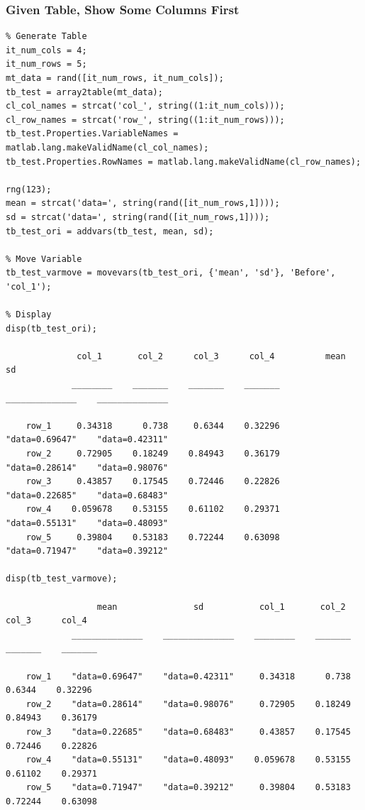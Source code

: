 \documentclass[
]{book}
\begin{document}
\hypertarget{given-table-show-some-columns-first}{%
\subsubsection{Given Table, Show Some Columns First}\label{given-table-show-some-columns-first}}

\begin{verbatim}
% Generate Table
it_num_cols = 4;
it_num_rows = 5;
mt_data = rand([it_num_rows, it_num_cols]);
tb_test = array2table(mt_data);
cl_col_names = strcat('col_', string((1:it_num_cols)));
cl_row_names = strcat('row_', string((1:it_num_rows)));
tb_test.Properties.VariableNames = matlab.lang.makeValidName(cl_col_names);
tb_test.Properties.RowNames = matlab.lang.makeValidName(cl_row_names);

rng(123);
mean = strcat('data=', string(rand([it_num_rows,1])));
sd = strcat('data=', string(rand([it_num_rows,1])));
tb_test_ori = addvars(tb_test, mean, sd);

% Move Variable
tb_test_varmove = movevars(tb_test_ori, {'mean', 'sd'}, 'Before', 'col_1');

% Display
disp(tb_test_ori);

              col_1       col_2      col_3      col_4          mean               sd      
             ________    _______    _______    _______    ______________    ______________

    row_1     0.34318      0.738     0.6344    0.32296    "data=0.69647"    "data=0.42311"
    row_2     0.72905    0.18249    0.84943    0.36179    "data=0.28614"    "data=0.98076"
    row_3     0.43857    0.17545    0.72446    0.22826    "data=0.22685"    "data=0.68483"
    row_4    0.059678    0.53155    0.61102    0.29371    "data=0.55131"    "data=0.48093"
    row_5     0.39804    0.53183    0.72244    0.63098    "data=0.71947"    "data=0.39212"

disp(tb_test_varmove);

                  mean               sd           col_1       col_2      col_3      col_4 
             ______________    ______________    ________    _______    _______    _______

    row_1    "data=0.69647"    "data=0.42311"     0.34318      0.738     0.6344    0.32296
    row_2    "data=0.28614"    "data=0.98076"     0.72905    0.18249    0.84943    0.36179
    row_3    "data=0.22685"    "data=0.68483"     0.43857    0.17545    0.72446    0.22826
    row_4    "data=0.55131"    "data=0.48093"    0.059678    0.53155    0.61102    0.29371
    row_5    "data=0.71947"    "data=0.39212"     0.39804    0.53183    0.72244    0.63098
\end{verbatim}
\end{document}
